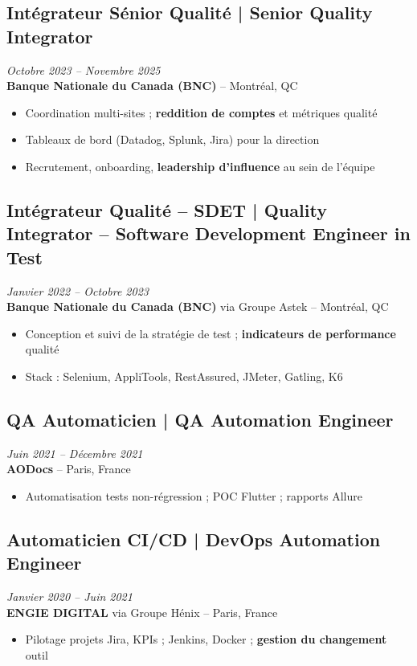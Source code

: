 \documentclass[11pt,a4paper]{article}
\begin{document}
\subsection*{Intégrateur Sénior Qualité | Senior Quality Integrator} \hfill \textit{Octobre 2023 -- Novembre 2025}\\
\textbf{Banque Nationale du Canada (BNC)} -- Montréal, QC\\
\begin{itemize}
    \item Coordination multi-sites ; \textbf{reddition de comptes} et métriques qualité
    \item Tableaux de bord (Datadog, Splunk, Jira) pour la direction
    \item Recrutement, onboarding, \textbf{leadership d'influence} au sein de l'équipe
\end{itemize}

\subsection*{Intégrateur Qualité -- SDET | Quality Integrator -- Software Development Engineer in Test} \hfill \textit{Janvier 2022 -- Octobre 2023}\\
\textbf{Banque Nationale du Canada (BNC)} via Groupe Astek -- Montréal, QC\\
\begin{itemize}
    \item Conception et suivi de la stratégie de test ; \textbf{indicateurs de performance} qualité
    \item Stack : Selenium, AppliTools, RestAssured, JMeter, Gatling, K6
\end{itemize}

\subsection*{QA Automaticien | QA Automation Engineer} \hfill \textit{Juin 2021 -- Décembre 2021}\\
\textbf{AODocs} -- Paris, France\\
\begin{itemize}
    \item Automatisation tests non-régression ; POC Flutter ; rapports Allure
\end{itemize}

\subsection*{Automaticien CI/CD | DevOps Automation Engineer} \hfill \textit{Janvier 2020 -- Juin 2021}\\
\textbf{ENGIE DIGITAL} via Groupe Hénix -- Paris, France\\
\begin{itemize}
    \item Pilotage projets Jira, KPIs ; Jenkins, Docker ; \textbf{gestion du changement} outil
\end{itemize}
\end{document}
